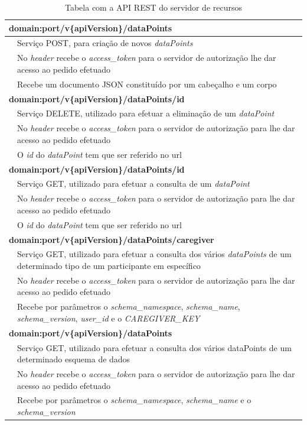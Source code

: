 \begin{table}[H]
\label{t:apirest-data}
\centering
\begin{tabularx}{1\textwidth}{|p{0.3cm} p{14.4cm}|}
\multicolumn{2}{l}{\textbf{domain:port/v\{apiVersion\}/dataPoints}}  \\ \hline 
 & Serviço POST, para criação de novos  \textit{dataPoints} \\
 & No  \textit{header} recebe o  \textit{access\_token} para o servidor de autorização lhe dar acesso ao pedido efetuado \\
 & Recebe um documento JSON constituído por um cabeçalho e um corpo \\ \hline
\multicolumn{2}{l}{\textbf{domain:port/v\{apiVersion\}/dataPoints/id}} \\ \hline
 & Serviço DELETE, utilizado para efetuar a eliminação de um  \textit{dataPoint} \\
 & No  \textit{header} recebe o  \textit{access\_token} para o servidor de autorização para lhe dar acesso ao pedido efetuado \\
 & O  \textit{id} do  \textit{dataPoint} tem que ser referido no url \\ \hline
 \multicolumn{2}{l}{\textbf{domain:port/v\{apiVersion\}/dataPoints/id}} \\ \hline
 & Serviço GET, utilizado para efetuar a consulta de um  \textit{dataPoint} \\
 & No  \textit{header} recebe o  \textit{access\_token} para o servidor de autorização para lhe dar acesso ao pedido efetuado \\
 & O  \textit{id} do  \textit{dataPoint} tem que ser referido no url \\ \hline
 \multicolumn{2}{l}{\textbf{domain:port/v\{apiVersion\}/dataPoints/caregiver}} \\ \hline
 & Serviço GET, utilizado para efetuar a consulta dos vários  \textit{dataPoints} de um determinado tipo de um participante em específico \\
 & No  \textit{header} recebe o  \textit{access\_token} para o servidor de autorização para lhe dar acesso ao pedido efetuado \\
 & Recebe por parâmetros o  \textit{schema\_namespace},  \textit{schema\_name},  \textit{schema\_version},  \textit{user\_id} e o  \textit{CAREGIVER\_KEY} \\ \hline
 \multicolumn{2}{l}{\textbf{domain:port/v\{apiVersion\}/dataPoints}} \\ \hline
 & Serviço GET, utilizado para efetuar a consulta dos vários dataPoints de um determinado esquema de dados \\
 & No  \textit{header} recebe o  \textit{access\_token} para o servidor de autorização para lhe dar acesso ao pedido efetuado \\
 & Recebe por parâmetros o  \textit{schema\_namespace},  \textit{schema\_name} e o  \textit{schema\_version} \\ \hline
\end{tabularx}
\caption{Tabela com a API REST do servidor de recursos}
\end{table}


